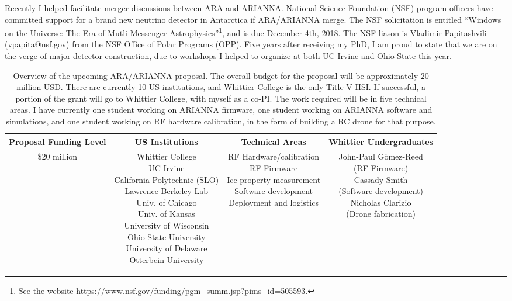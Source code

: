 \documentclass[../../main.tex]{subfiles}
\begin{document}
Recently I helped facilitate merger discussions between ARA and ARIANNA.  National Science Foundation (NSF) program officers have committed support for a brand new neutrino detector in Antarctica if ARA/ARIANNA merge.  The NSF solicitation is entitled ``Windows on the Universe: The Era of Mutli-Messenger Astrophysics''\footnote{See the website \url{https://www.nsf.gov/funding/pgm_summ.jsp?pims_id=505593}.}, and is due December 4th, 2018.  The NSF liason is Vladimir Papitashvili (vpapita@nsf.gov) from the NSF Office of Polar Programs (OPP).  Five years after receiving my PhD, I am proud to state that we are on the verge of major detector construction, due to workshops I helped to organize at both UC Irvine and Ohio State this year. \\ \hspace{0.1cm}

\begin{table}[ht]
\centering
\begin{tabular}{|c|c|c|c|}
\hline
Proposal Funding Level & US Institutions & Technical Areas & Whittier Undergraduates \\ \hline \hline
\$20 million & \makecell{Whittier College \\ UC Irvine \\ California Polytechnic (SLO) \\ Lawrence Berkeley Lab \\ Univ. of Chicago \\ Univ. of Kansas \\ University of Wisconsin \\ Ohio State University \\ University of Delaware \\ Otterbein University} & \makecell{RF Hardware/calibration \\ RF Firmware \\ Ice property measurement \\ Software development \\ Deployment and logistics} & \makecell{John-Paul G\`{o}mez-Reed \\ (RF Firmware) \\ Cassady Smith \\ (Software development) \\ Nicholas Clarizio \\ (Drone fabrication)} \\ \hline
\end{tabular}
\caption{\label{tab:proposal} Overview of the upcoming ARA/ARIANNA proposal.  The overall budget for the proposal will be approximately 20 million USD.  There are currently 10 US institutions, and Whittier College is the only Title V HSI.  If successful, a portion of the grant will go to Whittier College, with myself as a co-PI.  The work required will be in five technical areas.  I have currently one student working on ARIANNA firmware, one student working on ARIANNA software and simulations, and one student working on RF hardware calibration, in the form of building a RC drone for that purpose.}
\end{table}
\end{document}
